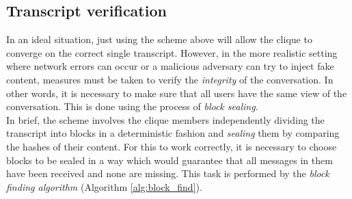 \documentclass[a4paper, twoside, 12pt]{report}
\begin{document}
\subsection{Transcript verification}
\label{subsec:prep.sealing}
In an ideal situation, just using the scheme above will allow the clique to converge on the correct single transcript. However, in the more realistic setting where network errors can occur or a malicious adversary can try to inject fake content, measures must be taken to verify the \emph{integrity} of the conversation. In other words, it is necessary to make sure that all users have the same view of the conversation. This is done using the process of \emph{block sealing}. \\

In brief, the scheme involves the clique members independently dividing the transcript into blocks in a deterministic fashion and \emph{sealing} them by comparing the hashes of their content. For this to work correctly, it is necessary to choose blocks to be sealed in a way which would guarantee that all messages in them have been received and none are missing. This task is performed by the \emph{block finding algorithm} (Algorithm \ref{alg:block_find}). \\
\end{document}
